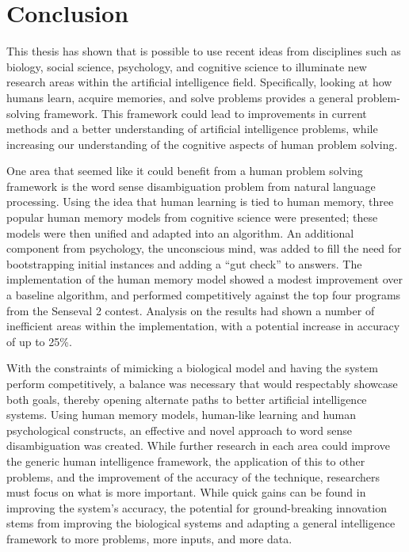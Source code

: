 \chapter{Conclusion}

This thesis has shown that is possible to use recent ideas from disciplines such
as biology, social science, psychology, and cognitive science to illuminate new
research areas within the artificial intelligence field.  Specifically, looking
at how humans learn, acquire memories, and solve problems provides a general
problem-solving framework.  This framework could lead to improvements in current
methods and a better understanding of artificial intelligence problems, while
increasing our understanding of the cognitive aspects of human problem solving.

One area that seemed like it could benefit from a human problem solving
framework is the word sense disambiguation problem from natural language
processing. Using the idea that human learning is tied to human memory, three
popular human memory models from cognitive science were presented; these models
were then unified and adapted into an algorithm.  An additional component from
psychology, the unconscious mind, was added to fill the need for bootstrapping
initial instances and adding a ``gut check'' to answers. The implementation of
the human memory model showed a modest improvement over a baseline algorithm,
and performed competitively against the top four programs from the Senseval 2
contest.  Analysis on the results had shown a number of inefficient areas within
the implementation, with a potential increase in accuracy of up to 25\%.

With the constraints of mimicking a biological model and having the system
perform competitively, a balance was necessary that would respectably showcase
both goals, thereby  opening alternate paths to better artificial intelligence
systems. Using human memory models, human-like learning and human psychological
constructs, an effective and novel approach to word sense disambiguation was
created.  While further research in each area could improve the generic human
intelligence framework, the application of this to other problems, and the
improvement of the accuracy of the technique, researchers must focus on what is
more important.  While quick gains can be found in improving the system's
accuracy, the potential for ground-breaking innovation stems from improving the
biological systems and adapting a general intelligence framework to more
problems, more inputs, and more data.

